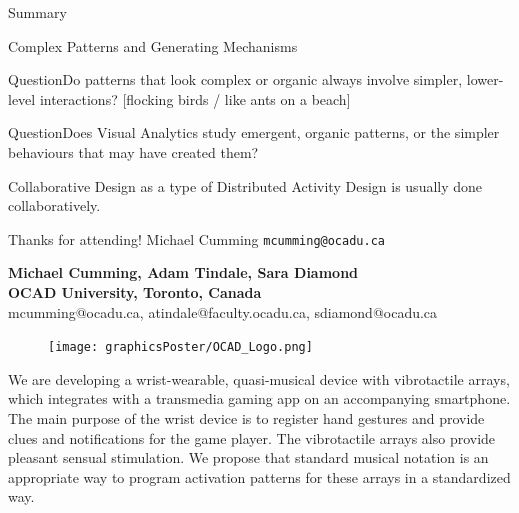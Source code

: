 \documentclass[handout]{beamer}
\begin{document}
\begin{frame}{Summary}
\begin{frame}{Complex Patterns and Generating Mechanisms}
\begin{block}{Question}Do patterns that look complex or organic always involve simpler, lower-level interactions? [flocking birds / like ants on a beach]
\end{block}
\pause

\begin{block}{Question}Does Visual Analytics study emergent, organic patterns, or the simpler behaviours that may have created them?
\end{block}
\end{frame}
	
\begin{frame}{Collaborative Design as a type of Distributed Activity}
Design is usually done collaboratively.
\bigskip

\begin{frame}{Thanks for attending!}
\bigskip
Michael Cumming
\texttt{mcumming@ocadu.ca}
\end{frame}

\setlength{\columnsep}{2cm}
\begin{multicols}{2}

\begin{center}
\textbf{Michael Cumming, Adam Tindale, Sara Diamond\\
OCAD University, Toronto, Canada}\\
mcumming@ocadu.ca,
atindale@faculty.ocadu.ca,
sdiamond@ocadu.ca\\
\end{center}
\vspace{1em}

\begin{figure}[H] \centering
\texttt{[image: graphicsPoster/OCAD\_Logo.png]}
\end{figure}

We are developing a wrist-wearable, quasi-musical device with vibrotactile arrays, which integrates with a transmedia gaming app on an accompanying smartphone. The main purpose of the wrist device is to register hand gestures and provide clues and notifications for the game player. The vibrotactile arrays also provide pleasant sensual stimulation. We propose that standard musical notation is an appropriate way to program activation patterns for these arrays in a standardized way.\\

\begin{center}


\end{center}
\end{multicols}
\end{frame}
\end{frame}
\end{document}
